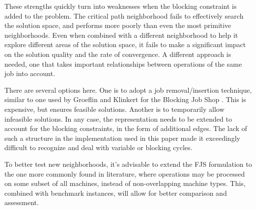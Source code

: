 \documentclass[a4paper,10pt]{article}
\begin{document}
These strengths quickly turn into weaknesses when the blocking constraint is added to the problem. The critical path neighborhood fails to effectively search the solution space, and performs more poorly than even the most primitive neighborhoods. Even when combined with a different neighborhood to help it explore different areas of the solution space, it fails to make a significant impact on the solution quality and the rate of convergence. A different approach is needed, one that takes important relationships between operations of the same job into account.

There are several options here. One is to adopt a job removal/insertion technique, similar to one used by Groeflin and Klinkert for the Blocking Job Shop \cite{lsn-bjs}. This is expensive, but ensures feasible solutions. Another is to temporarily allow infeasible solutions. In any case, the representation needs to be extended to account for the blocking constraints, in the form of additional edges. The lack of such a structure in the implementation used in this paper made it exceedingly difficult to recognize and deal with variable or blocking cycles.

To better test new neighborhoods, it's advisable to extend the FJS formulation to the one more commonly found in literature, where operations may be processed on some subset of all machines, instead of non-overlapping machine types. This, combined with benchmark instances, will allow for better comparison and assessment.

\printbibliography[heading=bibintoc]
\end{document}
